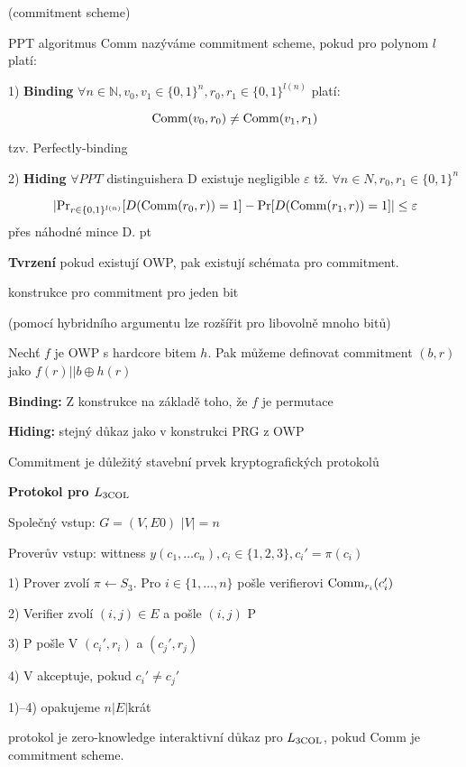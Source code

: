 \documentclass[a4paper,12pt,titlepage]{article}
\def\podnadpis#1{{\bigskip\bf\noindent#1\medskip\par}}
\def\definice{\noindent {\bf Definice: }}
\def\tvrzeni{\noindent {\bf Tvrzení: }}
\def\dukaz{\noindent {\bf Důkaz: }}
\def\Comm{{\rm Comm}}
\begin{document}
\definice(commitment scheme)

PPT algoritmus Comm nazýváme commitment scheme, pokud pro polynom $l$ platí:

1) {\bf Binding} $\forall n\in\mathbb{N},v_0,v_1\in\{0,1\}^n,r_0,r_1\in\{0,1\}^{l(n)}$ platí:

$$\Comm(v_0,r_0)\neq \Comm(v_1,r_1)$$

tzv. Perfectly-binding

2) {\bf Hiding} $\forall PPT$ distinguishera D existuje negligible $\varepsilon$ tž. $\forall n\in N,r_0,r_1\in\{0,1\}^n$

$$|{\rm Pr}_{r\in\{0,1\}^{l(n)}}[D(\Comm(r_0,r))=1]-{\rm Pr}[D(\Comm(r_1,r))=1]|\leq\varepsilon$$ přes náhodné mince D.
 pt

{\noindent \bf Tvrzení} pokud existují OWP, pak existují schémata pro commitment.

\dukaz konstrukce pro commitment pro jeden bit

(pomocí hybridního argumentu lze rozšířit pro libovolně mnoho bitů)

Nechť $f$ je OWP s hardcore bitem $h$. Pak můžeme definovat commitment $(b,r)$ jako $f(r)||b\oplus h(r)$

{\bf Binding:} Z konstrukce na základě toho, že $f$ je permutace

{\bf Hiding:} stejný důkaz jako v konstrukci PRG z OWP

\vskip 5pt


Commitment je důležitý stavební prvek kryptografických protokolů

\podnadpis{Protokol pro $L_{3\rm COL}$}

Společný vstup: $G=(V,E0)$ $|V|=n$

Proverův vstup: wittness $y(c_1,\dots c_n), c_i\in \{1,2,3\}, c_i'=\pi(c_i)$

1) Prover zvolí $\pi\leftarrow S_3$. Pro $i\in\{1,\dots,n\}$ pošle verifierovi $\Comm_{r_i}(c_i')$

2) Verifier zvolí $(i,j)\in E$ a pošle $(i,j)$ P

3) P pošle V $(c_i',r_i)$ a $(c_j',r_j)$

4) V akceptuje, pokud $c_i'\neq c_j'$
\vskip 5pt

1)--4) opakujeme $n|E|$krát
\vskip 10pt

\tvrzeni protokol je zero-knowledge interaktivní důkaz pro $L_{3\rm COL}$, pokud Comm je commitment scheme.
\end{document}
